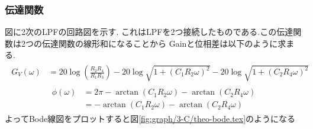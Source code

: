 \subsubsection{伝達関数}
図に2次のLPFの回路図を示す.
これはLPFを2つ接続したものである.この伝達関数は2つの伝達関数の線形和になることから
Gainと位相差は以下のように求まる.
\begin{align}
  \begin{split}
    G_V(\omega)&=20\log\left(\frac{R_2R_4}{R_1R_3}\right)-20\log\sqrt{1+(C_1R_2\omega)^2}
    -20\log\sqrt{1+(C_2R_4\omega)^2}
  \end{split}
\end{align}
\begin{align}
  \begin{split}
    \phi(\omega)&=2\pi-\arctan(C_1R_2\omega)-\arctan(C_2R_4\omega)\\
    &=-\arctan(C_1R_2\omega)-\arctan(C_2R_4\omega)
  \end{split}
\end{align}
よってBode線図をプロットすると図\ref{fig:graph/3-C/theo-bode.tex}のようになる
